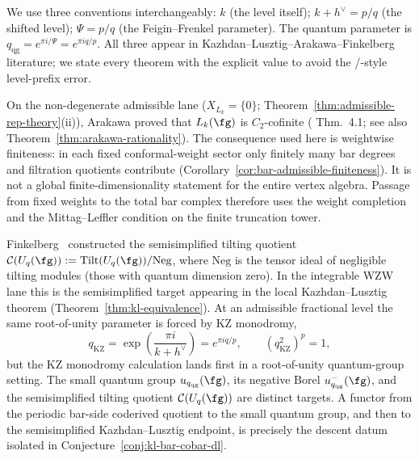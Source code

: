 \begin{remark}
\label{rem:level-parameter-periodic-cdg}
We use three conventions interchangeably:
$k$ (the level itself); $k+h^\vee = p/q$ (the shifted level);
$\Psi = p/q$ (the Feigin--Frenkel parameter). The quantum
parameter is $q_{\mathrm{qg}} = e^{\pi i / \Psi} = e^{\pi i q/p}$.
All three appear in Kazhdan--Lusztig--Arakawa--Finkelberg
literature; we state every theorem with the explicit value to
avoid the /-style level-prefix error.
\end{remark}

\begin{remark}
\label{rem:arakawa-c2-input}
On the non-degenerate admissible lane ($X_{L_k} = \{0\}$;
Theorem~\ref{thm:admissible-rep-theory}(ii)), Arakawa proved that
$L_k(\fg)$ is $C_2$-cofinite
\textup{(}\cite{Arakawa15} Thm.~4.1; see also
Theorem~\ref{thm:arakawa-rationality}\textup{)}.  The consequence used
here is weightwise finiteness: in each fixed conformal-weight sector
only finitely many bar degrees and filtration quotients contribute
\textup{(}Corollary~\ref{cor:bar-admissible-finiteness}\textup{)}.
It is not a global finite-dimensionality statement for the entire
vertex algebra.  Passage from fixed weights to the total bar complex
therefore uses the weight completion and the Mittag--Leffler condition
on the finite truncation tower.
\end{remark}

\begin{remark}
\label{rem:finkelberg-semisimp-input}
Finkelberg~\cite{Fin96} constructed the semisimplified tilting
quotient $\mathcal{C}(U_q(\fg)) :=
\mathrm{Tilt}(U_q(\fg))/\mathrm{Neg}$, where
$\mathrm{Neg}$ is the tensor ideal of negligible tilting modules
(those with quantum dimension zero).  In the integrable WZW lane this
is the semisimplified target appearing in the local
Kazhdan--Lusztig theorem
\textup{(}Theorem~\ref{thm:kl-equivalence}\textup{)}.  At an
admissible fractional level the same root-of-unity parameter is forced
by KZ monodromy,
\[
q_{\mathrm{KZ}}=\exp\!\left(\frac{\pi i}{k+h^\vee}\right)
=e^{\pi i q/p},
\qquad (q_{\mathrm{KZ}}^2)^p=1,
\]
but the KZ monodromy calculation lands first in a root-of-unity
quantum-group setting.  The small quantum group
$u_{q_{\mathrm{qg}}}(\fg)$, its negative Borel
$u_{q_{\mathrm{qg}}}^-(\fg)$, and the semisimplified tilting quotient
$\mathcal{C}(U_q(\fg))$ are distinct targets.  A functor from the
periodic bar-side coderived quotient to the small quantum group, and
then to the semisimplified Kazhdan--Lusztig endpoint, is precisely the
descent datum isolated in Conjecture~\ref{conj:kl-bar-cobar-dl}.
\end{remark}

